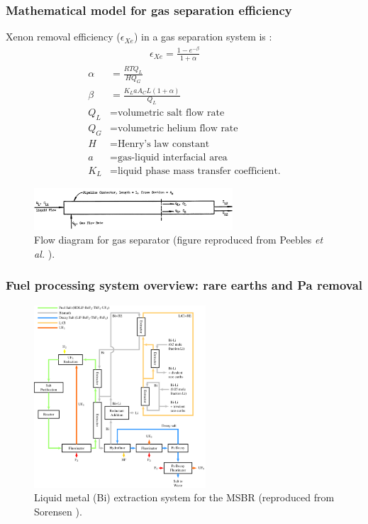 \begin{frame}
  \frametitle{Mathematical model for gas separation efficiency}
  		\vspace{-1mm}
Xenon removal efficiency ($\epsilon_{Xe}$) in a gas separation system is 
\cite{peebles_removal_1968}:
\begin{align}
& \qquad\qquad \epsilon_{Xe} = \frac{1-e^{-\beta}}{1+\alpha} \nonumber \\
\alpha &= \frac{RTQ_{L}}{HQ_{G}} \nonumber \\
\beta &= \frac{K_L a A_C L (1+\alpha)}{Q_{L}} \nonumber \\
Q_{L}&= \mbox{volumetric salt flow rate} \nonumber \\
Q_{G}&= \mbox{volumetric helium flow rate} \nonumber \\
H &= \mbox{Henry's law constant} \nonumber \\
a &= \mbox{gas-liquid interfacial area} \nonumber \\
K_L &= \mbox{liquid phase mass transfer coefficient.} \nonumber
\end{align}
		\vspace{-5mm}
  \begin{figure}[t]
	\includegraphics[width=0.66\textwidth]{./images/pipeline_contactor.png}
	\vspace{-2mm}
	\caption{Flow diagram for gas separator (figure reproduced from Peebles 
		\emph{et al.} \cite{peebles_removal_1968}).}
\end{figure}

\end{frame}


\begin{frame}
\frametitle{Fuel processing system overview: rare earths and Pa removal}
	\begin{figure}[htp!] %
		\centering
			\includegraphics[width=0.57\textwidth]{../figures/flowsheet.pdf}
			\vspace{-2mm}
		\caption{Liquid metal (Bi) extraction system for the \gls{MSBR} 
		(reproduced from Sorensen \cite{sorensen_one-fluid_2006}).} 
	\end{figure}
	
\end{frame}


